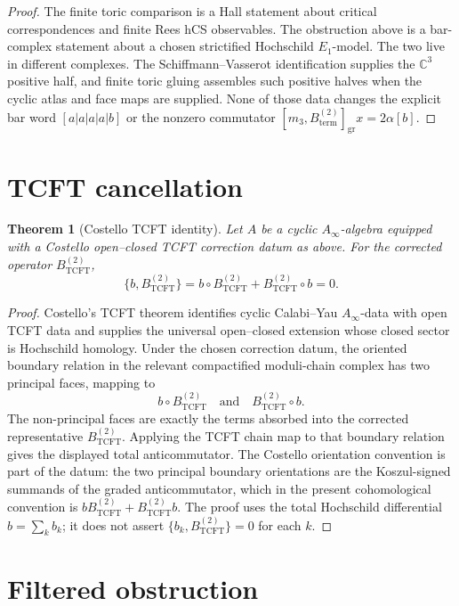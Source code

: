 \documentclass[11pt]{amsart}
\providecommand{\Ainf}{A_\infty}
\providecommand{\TCFT}{\mathrm{TCFT}}
\newtheorem{theorem}{Theorem}
\theoremstyle{definition}
\theoremstyle{remark}
\begin{document}
\begin{proof}
The finite toric comparison is a Hall statement about critical
correspondences and finite Rees hCS observables. The obstruction above is a
bar-complex statement about a chosen strictified Hochschild \(E_1\)-model.
The two live in different complexes. The Schiffmann--Vasserot
identification supplies the \(\mathbb C^3\) positive half, and finite
toric gluing assembles such positive halves when the cyclic atlas and face
maps are supplied. None of those data changes the explicit bar word
\([a|a|a|a|b]\) or the nonzero commutator
\([m_3,B^{(2)}_{\mathrm{term}}]_{\mathrm{gr}}x=2\alpha[b]\).
\end{proof}

\section{TCFT cancellation}

\begin{theorem}[Costello TCFT identity]
Let \(A\) be a cyclic \(\Ainf\)-algebra equipped with a Costello
open--closed TCFT correction datum as above.  For the corrected operator
\(B^{(2)}_{\TCFT}\),
\[
        \{b,B^{(2)}_{\TCFT}\}
        =
        b\circ B^{(2)}_{\TCFT}+B^{(2)}_{\TCFT}\circ b
        =
        0 .
\]
\end{theorem}

\begin{proof}
Costello's TCFT theorem identifies cyclic Calabi--Yau \(\Ainf\)-data with
open TCFT data and supplies the universal open--closed extension whose
closed sector is Hochschild homology.  Under the chosen correction datum,
the oriented boundary relation in the relevant compactified moduli-chain
complex has two principal faces, mapping to
\[
        b\circ B^{(2)}_{\TCFT}
        \quad\text{and}\quad
        B^{(2)}_{\TCFT}\circ b .
\]
The non-principal faces are exactly the terms absorbed into the corrected
representative \(B^{(2)}_{\TCFT}\).  Applying the TCFT chain map to that
boundary relation gives the displayed total anticommutator.  The Costello
orientation convention is part of the datum: the two principal boundary
orientations are the Koszul-signed summands of the graded anticommutator,
which in the present cohomological convention is
\(bB^{(2)}_{\TCFT}+B^{(2)}_{\TCFT}b\).  The proof uses the total
Hochschild differential \(b=\sum_k b_k\); it does not assert
\(\{b_k,B^{(2)}_{\TCFT}\}=0\) for each \(k\).
\end{proof}

\section{Filtered obstruction}
\end{document}
